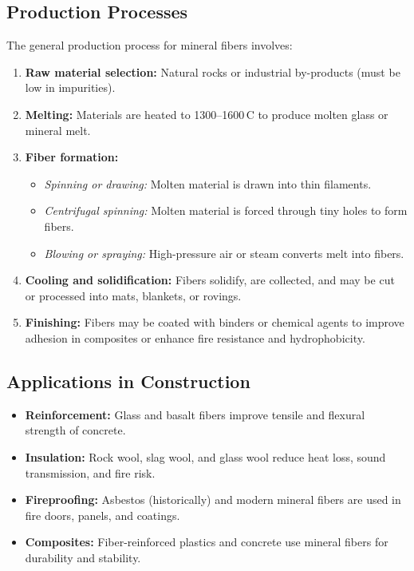 \documentclass[12pt,a4paper]{article}
\begin{document}
\subsection{Production Processes}
The general production process for mineral fibers involves:
\begin{enumerate}
    \item \textbf{Raw material selection:} Natural rocks or industrial by-products (must be low in impurities).
    \item \textbf{Melting:} Materials are heated to 1300--1600\,\textdegree C to produce molten glass or mineral melt.
    \item \textbf{Fiber formation:}
    \begin{itemize}
        \item \textit{Spinning or drawing:} Molten material is drawn into thin filaments.
        \item \textit{Centrifugal spinning:} Molten material is forced through tiny holes to form fibers.
        \item \textit{Blowing or spraying:} High-pressure air or steam converts melt into fibers.
    \end{itemize}
    \item \textbf{Cooling and solidification:} Fibers solidify, are collected, and may be cut or processed into mats, blankets, or rovings.
    \item \textbf{Finishing:} Fibers may be coated with binders or chemical agents to improve adhesion in composites or enhance fire resistance and hydrophobicity.
\end{enumerate}

\subsection{Applications in Construction}
\begin{itemize}
    \item \textbf{Reinforcement:} Glass and basalt fibers improve tensile and flexural strength of concrete.
    \item \textbf{Insulation:} Rock wool, slag wool, and glass wool reduce heat loss, sound transmission, and fire risk.
    \item \textbf{Fireproofing:} Asbestos (historically) and modern mineral fibers are used in fire doors, panels, and coatings.
    \item \textbf{Composites:} Fiber-reinforced plastics and concrete use mineral fibers for durability and stability.
\end{itemize}
\end{document}
